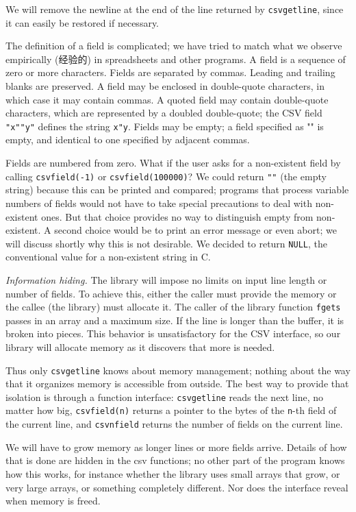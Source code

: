 We will remove the newline at the end of the line returned by
\verb'csvgetline', since it can easily be restored if necessary.

The definition of a field is complicated; we have tried to match what we
observe empirically (经验的) in spreadsheets and other programs. A field is
a sequence of zero or more characters. Fields are separated by commas.
Leading and trailing blanks are preserved. A field may be enclosed in
double-quote characters, in which case it may contain commas. A quoted
field may contain double-quote characters, which are represented by a
doubled double-quote; the CSV field \verb'"x""y"' defines the string
\verb'x"y'.  Fields may be empty; a field specified as "" is empty, and
identical to one specified by adjacent commas.

Fields are numbered from zero. What if the user asks for a non-existent
field by calling \verb'csvfield(-1)' or \verb'csvfield(100000)'? We could
return \verb'""' (the empty string) because this can be printed and
compared; programs that process variable numbers of fields would not have
to take special precautions to deal with non-existent ones. But that choice
provides no way to distinguish empty from non-existent. A second choice
would be to print an error message or even abort; we will discuss shortly
why this is not desirable. We decided to return \verb'NULL', the
conventional value for a non-existent string in C.

\emph{Information hiding.} The library will impose no limits on input line
length or number of fields. To achieve this, either the caller must provide
the memory or the callee (the library) must allocate it. The caller of the
library function \verb'fgets' passes in an array and a maximum size. If the
line is longer than the buffer, it is broken into pieces.  This behavior is
unsatisfactory for the CSV interface, so our library will allocate memory
as it discovers that more is needed.

Thus only \verb'csvgetline' knows about memory management; nothing about
the way that it organizes memory is accessible from outside. The best way
to provide that isolation is through a function interface:
\verb'csvgetline' reads the next line, no matter how big,
\verb'csvfield(n)' returns a pointer to the bytes of the \verb'n'-th field
of the current line, and \verb'csvnfield' returns the number of fields on
the current line.

We will have to grow memory as longer lines or more fields arrive. Details
of how that is done are hidden in the csv functions; no other part of the
program knows how this works, for instance whether the library uses small
arrays that grow, or very large arrays, or something completely different.
Nor does the interface reveal when memory is freed.

